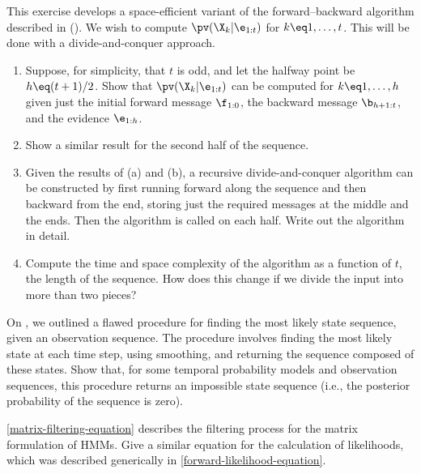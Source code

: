 \begin{exercise}
This exercise develops a space-efficient variant of the
forward--backward algorithm described in
 (). We wish to compute
\(\pv(\X_k|\e_{1:t})\) for \(k\eq 1,\ldots ,t\). This will be done with a
divide-and-conquer approach.
\begin{enumerate}
\item Suppose, for simplicity, that \(t\) is odd, and let the halfway point
be \(h\eq (t+1)/2\). Show that 
\(\pv(\X_k|\e_{1:t})\) can be computed for \(k\eq 1,\ldots ,h\)
given just the initial forward message \(\f_{1:0}\), the backward message
\(\b_{h+1:t}\), and the evidence \(\e_{1:h}\). 
\item Show a similar result for the second half of the sequence.
\item Given the results of (a) and (b), a recursive
divide-and-conquer algorithm can be constructed by first running
forward along the sequence and then backward from the end, storing
just the required messages at the middle and the ends. Then the
algorithm is called on each half. Write out the algorithm in detail.
\item Compute the time and space complexity of the algorithm as a
function of \(t\), the length of the sequence. How does this change if
we divide the input into more than two pieces?
\end{enumerate}
\end{exercise} 

\begin{exercise}
On , we outlined a flawed procedure for
finding the most likely state sequence, given an observation sequence.
The procedure involves finding the most likely state at each time
step, using smoothing, and returning the sequence composed of these
states. Show that, for some temporal probability models and
observation sequences, this procedure returns an impossible state
sequence (i.e., the posterior probability of the sequence is zero).
\end{exercise} 



\begin{exercise}
\eqref{matrix-filtering-equation} describes the filtering process for
the matrix formulation of HMMs. Give a similar equation for the
calculation of likelihoods, which was described generically in
\eqref{forward-likelihood-equation}.
\end{exercise} 

